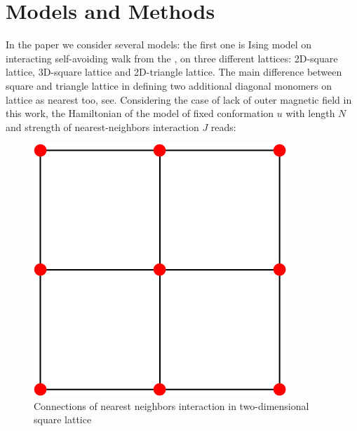 \documentclass[aps,pre,amssymb,amsmath,twocolumn,floatfix]{revtex4-2}
\begin{document}
\section{Models and Methods}
In the paper we consider several models: the first one is Ising model on interacting self-avoiding walk from the \cite{faizullina2021critical}, on three different lattices: 2D-square lattice, 3D-square lattice and 2D-triangle lattice. The main difference between square and triangle lattice in defining two additional diagonal monomers on lattice as nearest too, see. Considering the case of lack of outer magnetic field in this work, the Hamiltonian of the model of fixed conformation $u$ with length $N$ and strength of nearest-neighbors interaction $J$ reads:

\begin{figure}[h!]
\begin{minipage}{0.45\columnwidth}
    \includegraphics[width=\textwidth]{Images/SqLattice.png}
    \caption{Connections of nearest neighbors interaction in two-dimensional square lattice}
    \label{fig:ISAW_A_J_Zoom}
\end{minipage}
\hfill
\begin{minipage}{0.45\columnwidth}

\end{minipage}
\end{figure}
\end{document}
